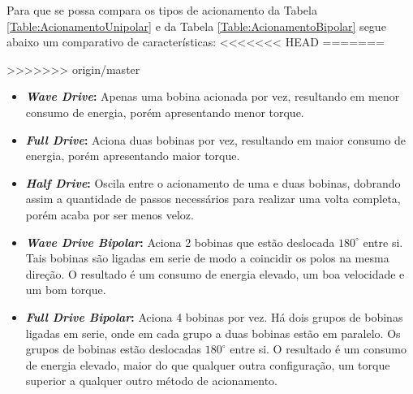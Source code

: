 \begin{table}[H]
\begin{tabular}{|cccc|}
		\hline
	\end{tabular}
\end{table} 

Para que se possa compara os tipos de acionamento da Tabela \ref{Table:AcionamentoUnipolar} e da Tabela \ref{Table:AcionamentoBipolar} segue abaixo um comparativo de características:
<<<<<<< HEAD
=======

>>>>>>> origin/master
\begin{itemize}
	\item \textbf{\textit{Wave Drive}:} Apenas uma bobina acionada por vez, resultando em  menor consumo de energia, porém apresentando menor torque.
	\item \textbf{\textit{Full Drive}:} Aciona duas bobinas por vez, resultando em  maior consumo de energia, porém apresentando maior torque.
	\item \textbf{\textit{Half Drive}:} Oscila entre o acionamento de uma e duas bobinas, dobrando assim a  quantidade de passos necessários para realizar uma volta completa, porém acaba por ser menos veloz.
	\item \textbf{\textit{Wave Drive Bipolar}:} Aciona 2 bobinas que estão deslocada $180^{\circ}$ entre si. Tais bobinas são ligadas em serie de modo a coincidir os polos na mesma direção. O resultado é um consumo de energia elevado, um boa velocidade e um bom torque.
	\item \textbf{\textit{Full Drive Bipolar}:} Aciona 4 bobinas por vez. Há dois grupos de bobinas ligadas em serie, onde em cada grupo a duas bobinas estão em paralelo. Os grupos de bobinas estão deslocadas $180^{\circ}$ entre si.  O resultado é um consumo de energia elevado, maior do que qualquer outra configuração,  um torque superior a qualquer outro método de acionamento.
\end{itemize}
